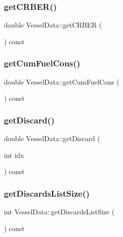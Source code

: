 \mbox{\label{class_vessel_data_a7d9d783f0ce6856464e98c34f9a0cae8}} 
\subsubsection{\texorpdfstring{getCRBER()}{getCRBER()}}
{\footnotesize\ttfamily double Vessel\+Data\+::get\+C\+R\+B\+ER (\begin{DoxyParamCaption}{ }\end{DoxyParamCaption}) const}

\mbox{\label{class_vessel_data_ae89bf2046c405e5a7374ae84b9d1cbda}} 
\subsubsection{\texorpdfstring{getCumFuelCons()}{getCumFuelCons()}}
{\footnotesize\ttfamily double Vessel\+Data\+::get\+Cum\+Fuel\+Cons (\begin{DoxyParamCaption}{ }\end{DoxyParamCaption}) const}

\mbox{\label{class_vessel_data_af973c2e441f11e74274c467ec200c032}} 
\subsubsection{\texorpdfstring{getDiscard()}{getDiscard()}}
{\footnotesize\ttfamily double Vessel\+Data\+::get\+Discard (\begin{DoxyParamCaption}\item[{int}]{idx }\end{DoxyParamCaption}) const\hspace{0.3cm}{\ttfamily [inline]}}

\mbox{\label{class_vessel_data_a1f0475215511f5cd974af692eb167baa}} 
\subsubsection{\texorpdfstring{getDiscardsListSize()}{getDiscardsListSize()}}
{\footnotesize\ttfamily int Vessel\+Data\+::get\+Discards\+List\+Size (\begin{DoxyParamCaption}{ }\end{DoxyParamCaption}) const\hspace{0.3cm}{\ttfamily [inline]}}

